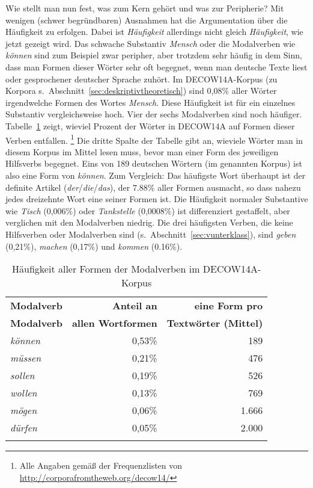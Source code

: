Wie stellt man nun fest, was zum Kern gehört und was zur Peripherie?
Mit wenigen (schwer begründbaren) Ausnahmen hat die Argumentation über die Häufigkeit zu erfolgen.
Dabei ist \textit{Häufigkeit} allerdings nicht gleich \textit{Häufigkeit}, wie jetzt gezeigt wird.
Das schwache Substantiv \textit{Mensch} oder die Modalverben wie \textit{können} sind zum Beispiel zwar peripher, aber trotzdem sehr häufig in dem Sinn, dass man Formen dieser Wörter sehr oft begegnet, wenn man deutsche Texte liest oder gesprochener deutscher Sprache zuhört.
Im DECOW14A-Korpus (zu Korpora s.\ Abschnitt~\ref{sec:deskriptivtheoretisch}) sind 0,08\% aller Wörter irgendwelche Formen des Wortes \textit{Mensch}.
Diese Häufigkeit ist für ein einzelnes Substantiv vergleichsweise hoch. 
Vier der sechs Modalverben sind noch häufiger.
Tabelle~\ref{tab:modvfreq} zeigt, wieviel Prozent der Wörter in DECOW14A auf Formen dieser Verben entfallen.%
\footnote{Alle Angaben gemäß der Frequenzlisten von \url{http://corporafromtheweb.org/decow14/}}
Die dritte Spalte der Tabelle gibt an, wieviele Wörter man in diesem Korpus im Mittel lesen muss, bevor man einer Form des jeweiligen Hilfsverbs begegnet.
Eins von 189 deutschen Wörtern (im genannten Korpus) ist also eine Form von \textit{können}.
Zum Vergleich: Das häufigste Wort überhaupt ist der definite Artikel (\textit{der}\slash\textit{die}\slash\textit{das}), der 7.88\% aller Formen ausmacht, so dass nahezu jedes dreizehnte Wort eine seiner Formen ist.
Die Häufigkeit normaler Substantive wie \textit{Tisch} (0,006\%) oder \textit{Tankstelle} (0,0008\%) ist differenziert gestaffelt, aber verglichen mit den Modalverben niedrig.
Die drei häufigsten Verben, die keine Hilfsverben oder Modalverben sind (s.\ Abschnitt~\ref{sec:vunterklass}), sind \textit{geben} (0,21\%), \textit{machen} (0,17\%) und \textit{kommen} (0.16\%).

\begin{table}
	\begin{tabular}{lrr}
	  \lsptoprule
	  \textbf{Modalverb} & \textbf{Anteil an} & \textbf{eine Form pro}\\
	  \textbf{Modalverb} & \textbf{allen Wortformen} & \textbf{Textwörter (Mittel)}\\
	  \midrule
	  \textit{können} & 0,53\% &   189 \\
	  \textit{müssen} & 0,21\% &   476 \\
	  \textit{sollen} & 0,19\% &   526 \\
	  \textit{wollen} & 0,13\% &   769 \\
	  \textit{mögen}  & 0,06\% & 1.666\\
	  \textit{dürfen} & 0,05\% & 2.000\\
	  \lspbottomrule
	\end{tabular}
	\label{tab:modvfreq}
	\caption{Häufigkeit aller Formen der Modalverben im DECOW14A-Korpus}
\end{table}

